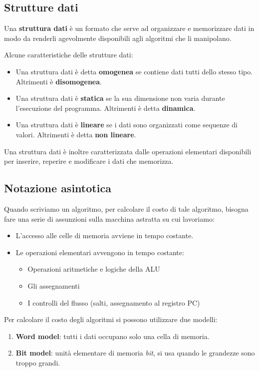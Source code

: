 \subsection{Strutture dati}
\begin{definition}
Una \textbf{struttura dati} è un formato che serve ad organizzare e memorizzare dati in modo da renderli agevolmente disponibili agli algoritmi che li manipolano.
\end{definition}
\hspace{-15pt}Alcune caratteristiche delle strutture dati:
\begin{itemize}
    \item Una struttura dati è detta \textbf{omogenea} se contiene dati tutti dello stesso tipo. Altrimenti è \textbf{disomogenea}.
    \item Una struttura dati è \textbf{statica} se la sua dimensione non varia durante l'esecuzione del programma. Altrimenti è detta \textbf{dinamica}.
    \item Una struttura dati è \textbf{lineare} se i dati sono organizzati come sequenze di valori. Altrimenti è detta \textbf{non lineare}.
\end{itemize}
Una struttura dati è inoltre caratterizzata dalle operazioni elementari disponibili per inserire, reperire e modificare i dati che memorizza.

\subsection{Notazione asintotica}
Quando scriviamo un algoritmo, per calcolare il costo di tale algoritmo, bisogna fare una serie di assunzioni sulla macchina astratta su cui lavoriamo:
\begin{itemize}
    \item L'accesso alle celle di memoria avviene in tempo costante.
    \item Le operazioni elementari avvengono in tempo costante:
    \begin{itemize}
    	\item Operazioni aritmetiche e logiche della ALU
    	\item Gli assegnamenti
    	\item I controlli del flusso (salti, assegnamento al registro PC)
    \end{itemize}
    
\end{itemize}
Per calcolare il costo degli algoritmi si possono utilizzare due modelli:
\begin{enumerate}
    \item \textbf{Word model}: tutti i dati occupano solo una cella di memoria.
    \item \textbf{Bit model}: unità elementare di memoria \emph{bit}, si usa quando le grandezze sono troppo grandi.
\end{enumerate}

